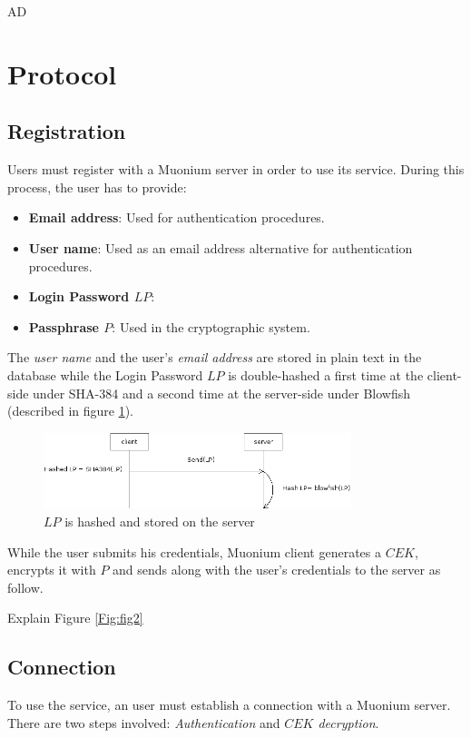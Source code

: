 AD\documentclass[a4paper,10pt]{article}
\begin{document}
\section{Protocol}
\subsection{Registration}
Users must register with a Muonium server in order to use its service. During this process, the user has to provide:

\begin{itemize}
    \item \textbf{Email address}: Used for authentication procedures.
    \item \textbf{User name}: Used as an email address alternative for authentication procedures.
    \item \textbf{Login Password $LP$}:
    \item \textbf{Passphrase $P$}: Used in the cryptographic system.
\end{itemize}

The \emph{user name} and the user's \emph{email address} are stored in plain text in the database while the Login Password $LP$ is double-hashed a first time at the client-side under SHA-384 and a second time at the server-side under Blowfish (described in figure \ref{Fig:fig1}).

\begin{figure}[!h]
\centering
\includegraphics[width=0.8\textwidth]{diagram/figure1}
\caption{$LP$ is hashed and stored on the server}
\label{Fig:fig1}
\end{figure}

While the user submits his credentials, Muonium client generates a $CEK$, encrypts it with $P$ and sends along with the user's credentials to the server as follow.

Explain Figure \ref{Fig:fig2}

\subsection{Connection}
To use the service, an user must establish a connection with a Muonium server. There are two steps involved: \emph{Authentication} and \emph{$CEK$ decryption}.
\end{document}
